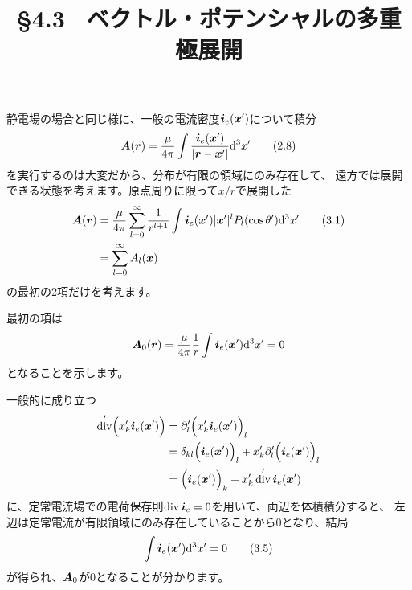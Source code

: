 \documentclass[a4paper, 12pt]{jsarticle}
\title{\S 4.3 \ ベクトル・ポテンシャルの多重極展開}
\def\vec#1{\mbox{\boldmath $#1$}}
\newcommand{\ddif}{{\rm d}}
\DeclareMathOperator{\Div}{div}
\begin{document}
\maketitle

静電場の場合と同じ様に、一般の電流密度$\vec{i}_{e}(\vec{x}')$について積分
\begin{align}
	\vec{A}(\vec{r}) = \frac{\mu}{4\pi} \int
	\frac{\vec{i}_e(\vec{x}')}{|\vec{r} - \vec{x}'|} \ddif^3 x'
	\tag{2.8} \label{eq:BS}
\end{align}
を実行するのは大変だから、分布が有限の領域にのみ存在して、
遠方では展開できる状態を考えます。原点周りに限って$x/r$で展開した
\begin{align}
	\vec{A}(\vec{r}) &= \frac{\mu}{4\pi} \sum_{l=0}^{\infty} \frac{1}{r^{l+1}}
	\int \vec{i}_e(\vec{x}') |\vec{x}'|^l P_l(\cos \theta') \ddif^3 x'
	\tag{3.1} \\
	&= \sum_{l=0}^{\infty} A_l(\vec{x})
\end{align}
の最初の2項だけを考えます。

最初の項は
\begin{align}
	\vec{A}_0(\vec{r}) = \frac{\mu}{4\pi} \frac{1}{r}
	\int \vec{i}_e(\vec{x}')\ddif^3 x'
	= 0
\end{align}
となることを示します。

一般的に成り立つ
\begin{align}
	\Div' \Bigl( x_k' \vec{i}_e(\vec{x}') \Bigr)
	&= \partial'_l \Bigl(x'_k \vec{i}_e(\vec{x}') \Bigr)_l \\
	&= \delta_{kl} \Bigl( \vec{i}_e(\vec{x}') \Bigr)_l
	+ x'_k \partial'_l \Bigl( \vec{i}_e(\vec{x}') \Bigr)_l \\
	&= \Bigl( \vec{i}_e(\vec{x}') \Bigr)_k + x'_k \Div' \vec{i}_e(\vec{x}')
\end{align}
に、定常電流場での電荷保存則$\Div \vec{i}_e = 0$を用いて、両辺を体積積分すると、
左辺は定常電流が有限領域にのみ存在していることから$0$となり、結局
\begin{align}
	\int \vec{i}_e(\vec{x}') \ddif^3 x' = 0 \tag{3.5} \label{eq:i=0}
\end{align}
が得られ、$\vec{A}_0$が$0$となることが分かります。
\end{document}
